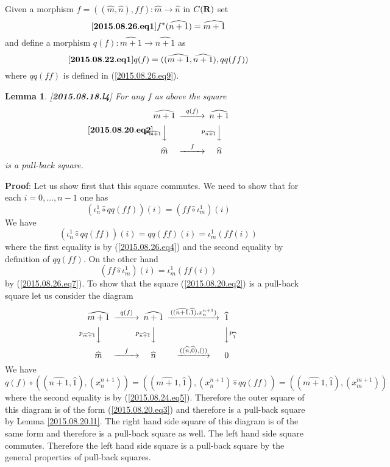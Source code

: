 \documentclass[11pt]{article}
\newenvironment{eq}{\begin{equation}}{\end{equation}}
\newenvironment{proof}{{\bf Proof}:}{\vskip 5mm }
\newtheorem{lemma}[proposition]{Lemma}
\newcommand{\llabel}[1]{\label{#1}[{\bf #1}]}
\newcommand{\sr}{\rightarrow}
\newcommand{\rr}{{\bf R}}
\newcommand{\wh}{\widehat}
\newcommand{\hc}{\wh{\circ}}
\begin{document}
%
Given a morphism $f=((\wh{m},\wh{n}),ff):\wh{m}\sr \wh{n}$ in $C(\rr)$ set
%
\begin{eq}
\llabel{2015.08.26.eq1}
f^*(\wh{n+1})=\wh{m+1}
\end{eq}
%
and define a morphism $q(f):\wh{m+1}\sr \wh{n+1}$ as  
%
\begin{eq}
\llabel{2015.08.22.eq1}
q(f)=((\wh{m+1},\wh{n+1}),qq(ff))
\end{eq}
% 
where $qq(ff)$ is defined in (\ref{2015.08.26.eq9}).
%
\begin{lemma}
\llabel{2015.08.18.l4}
For any $f$ as above the square
%
\begin{eq}\llabel{2015.08.20.eq2}
\begin{CD}
\wh{m+1} @>q(f)>> \wh{n+1}\\
@Vp_{\wh{m+1}}VV @Vp_{\wh{n+1}}VV\\
\wh{m} @>f>> \wh{n}
\end{CD}
\end{eq}
%
is a pull-back square.
\end{lemma}
%
\begin{proof}
Let us show first that this square commutes. We need to show that for each $i=0,\dots, n-1$ one has
%
$$(\iota_n^1\hc qq(ff))(i)=(ff\hc \iota_m^1)(i)$$
%
We have
%
$$(\iota_n^1\hc qq(ff))(i)=qq(ff)(i)=\iota_m^1(ff(i))$$
%
where the first equality is by (\ref{2015.08.26.eq4}) and the second equality by definition of $qq(ff)$. On the other hand
%
$$(ff\hc \iota_m^1)(i)=\iota_m^1(ff(i))$$
%
by (\ref{2015.08.26.eq7}).  To show that the square (\ref{2015.08.20.eq2}) is a pull-back square let us consider the diagram
%
$$
\begin{CD}
\wh{m+1} @>q(f)>> \wh{n+1} @>((\wh{n+1},\wh{1}),x_n^{n+1})>> \wh{1}\\
@Vp_{\wh{m+1}}VV @Vp_{\wh{n+1}}VV @VVp_{\wh{1}}V\\
\wh{m} @>f>> \wh{n} @>((\wh{n},\wh{0}),())>> 0
\end{CD}
$$
%
We have
%
\begin{eq}\label{2015.08.20.eq4}
q(f)\circ ((\wh{n+1},\wh{1}),(x_n^{n+1}))=((\wh{m+1},\wh{1}),(x_n^{n+1})\hc qq(ff))=((\wh{m+1},\wh{1}),(x_m^{m+1}))
\end{eq}
%
where the second equality is by (\ref{2015.08.24.eq5}). Therefore the outer square of this diagram is of the form (\ref{2015.08.20.eq3}) and therefore is a pull-back square by Lemma \ref{2015.08.20.l1}. The right hand side square of this diagram is of the same form and therefore is a pull-back square as well. The left hand side square commutes. Therefore the left hand side square is a pull-back square by the general properties of pull-back squares.
\end{proof}
\end{document}
